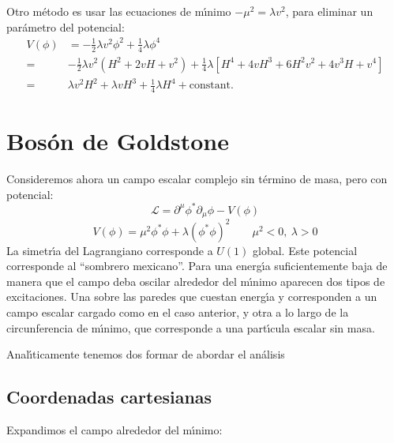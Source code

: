 Otro m\'etodo es usar las ecuaciones de m\'\i nimo $-\mu^2=\lambda v^2$, para eliminar un par\'ametro del potencial:
\begin{align}
  V(\phi)&=-\tfrac{1}{2}\lambda v^2\phi^2+\tfrac{1}{4}\lambda\phi^4\nonumber\\
  =&-\tfrac{1}{2}\lambda v^2 \left(H^2+2vH+v^2\right)+\tfrac{1}{4}\lambda\left[H^4+4vH^3+6H^2v^2+4v^3H+v^4\right]\nonumber\\
  =&\lambda v^2H^2+\lambda vH^3+\tfrac{1}{4}\lambda H^4+\text{constant}.
\end{align}

\section{Bos\'on de Goldstone}
\label{sec:boson-de-goldstone}

Consideremos ahora un campo escalar complejo sin t\'ermino de masa, pero con potencial:
\begin{equation}
  \label{eq:85}
  \mathcal{L}=\partial^\mu\phi^*\partial_\mu\phi-V(\phi)
\end{equation}
\begin{equation}
  V(\phi)=\mu^2\phi^*\phi+\lambda(\phi^*\phi)^2 
  \qquad 
  \mu^2\lt 0,\ \lambda\gt 0 
\end{equation}
La simetr\'\i a del Lagrangiano corresponde a $U(1)$ global. Este potencial corresponde al ``sombrero mexicano''. Para una energ\'\i a suficientemente baja de manera que el campo deba oscilar alrededor del m\'\i nimo aparecen dos tipos de excitaciones. Una sobre las paredes  que cuestan energ\'\i a y corresponden a un campo escalar cargado como en el caso anterior, y otra a lo largo de la circunferencia de m\'\i nimo, que corresponde a una part\'\i cula escalar sin masa.
 

Anal\'\i ticamente tenemos dos formar de abordar el an\'alisis

\subsection{Coordenadas cartesianas}
Expandimos el campo alrededor del m\'\i nimo:


